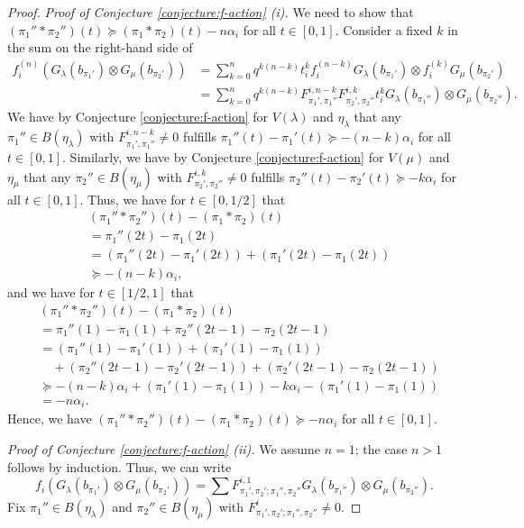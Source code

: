 \documentclass[final]{amsart}
\theoremstyle{plain}
\theoremstyle{definition}
\begin{document}
\begin{proof}
    \emph{Proof of Conjecture \ref{conjecture:f-action} (i).}
    We need to show that $(\pi_1'' * \pi_2'')(t) \succeq (\pi_1 * \pi_2)(t) - n\alpha_i$ for all $t \in [0, 1]$.
    Consider a fixed $k$ in the sum on the right-hand side of
    \begin{align*}
        f_i^{(n)} (G_\lambda(b_{\pi_1'}) \otimes G_\mu(b_{\pi_2'}))
        &= \sum_{k=0}^n q^{k(n-k)} t_i^k f_i^{(n-k)} G_\lambda(b_{\pi_1'}) \otimes f_i^{(k)} G_\mu(b_{\pi_2'}) \\
        &= \sum_{k=0}^n q^{k(n-k)} F_{\pi_1',\pi_1''}^{i,n-k} F_{\pi_2',\pi_2''}^{i,k} t_i^k G_\lambda(b_{\pi_1''}) \otimes G_\mu(b_{\pi_2''}).
    \end{align*}
    We have by Conjecture \ref{conjecture:f-action} for $V(\lambda)$ and $\eta_\lambda$ that any $\pi_1'' \in B(\eta_\lambda)$ with $F_{\pi_1',\pi_1''}^{i,n-k} \neq 0$ fulfills $\pi_1''(t) - \pi_1'(t) \succeq -(n-k)\alpha_i$ for all $t \in [0, 1]$.
    Similarly, we have by Conjecture \ref{conjecture:f-action} for $V(\mu)$ and $\eta_\mu$ that any $\pi_2'' \in B(\eta_\mu)$ with $F_{\pi_2',\pi_2''}^{i,k} \neq 0$ fulfills $\pi_2''(t) - \pi_2'(t) \succeq -k\alpha_i$ for all $t \in [0, 1]$.
    Thus, we have for $t \in [0, 1/2]$ that
    \begin{align*}
        & (\pi_1''*\pi_2'')(t) - (\pi_1*\pi_2)(t) \\
        &= \pi_1''(2t) - \pi_1(2t) \\
        &= (\pi_1''(2t) - \pi_1'(2t)) + (\pi_1'(2t) - \pi_1(2t)) \\
        &\succeq -(n-k)\alpha_i,
    \end{align*}
    and we have for $t \in [1/2, 1]$ that
    \begin{align*}
        & (\pi_1''*\pi_2'')(t) - (\pi_1*\pi_2)(t) \\
        &= \pi_1''(1) - \pi_1(1) + \pi_2''(2t-1) - \pi_2(2t-1) \\
        &= (\pi_1''(1) - \pi_1'(1)) + (\pi_1'(1) - \pi_1(1)) \\
        &\quad + (\pi_2''(2t-1) - \pi_2'(2t-1)) + (\pi_2'(2t-1) - \pi_2(2t-1)) \\
        &\succeq -(n-k)\alpha_i + (\pi_1'(1) - \pi_1(1)) - k\alpha_i  - (\pi_1'(1) - \pi_1(1)) \\
        &= -n\alpha_i.
    \end{align*}
    Hence, we have $(\pi_1''*\pi_2'')(t) - (\pi_1*\pi_2)(t) \succeq -n\alpha_i$ for all $t \in [0, 1]$.

    \emph{Proof of Conjecture \ref{conjecture:f-action} (ii).}
    We assume $n = 1$; the case $n > 1$ follows by induction.
    Thus, we can write
    \[
        f_i (G_\lambda(b_{\pi_1'}) \otimes G_\mu(b_{\pi_2'})) = \sum F_{\pi_1',\pi_2';\pi_1'',\pi_2''}^{i,1} G_\lambda(b_{\pi_1''}) \otimes G_\mu(b_{\pi_2''}).
    \]
    Fix $\pi_1'' \in B(\eta_\lambda)$ and $\pi_2'' \in B(\eta_\mu)$ with $F_{\pi_1',\pi_2';\pi_1'',\pi_2''}^i \neq 0$.


\end{proof}
\end{document}

